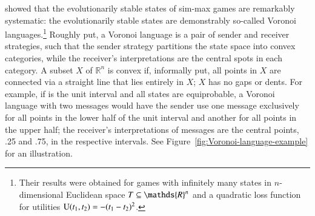 \documentclass[fleqn,reqno,10pt]{article}
\begin{document}
\citet{JagerMetzger2011:Voronoi-Languag} showed that the evolutionarily stable states of
sim-max games are remarkably systematic: the evolutionarily stable states are demonstrably
so-called Voronoi languages.\footnote{Their results were obtained for games with infinitely
  many states in $n$-dimensional Euclidean space $\States \subseteq \mathds{R}^n$ and a
  quadratic loss function for utilities
  $\mathrm{U}(t_{\mathrm{1}}, t_{\mathrm{2}}) = - (t_{\mathrm{1}} - t_{\mathrm{2}})^2$.} Roughly put, a Voronoi
language is a pair of sender and receiver strategies, such that the sender strategy partitions
the state space into convex categories, while the receiver's interpretations are the central
spots in each category. A subset $X$ of $\mathds{R}^n$ is convex if, informally put, all points
in $X$ are connected via a straight line that lies entirely in $X$; $X$ has no gaps or
dents. For example, if \States is the unit interval and all states are equiprobable, a Voronoi
language with two messages would have the sender use one message exclusively for all points in
the lower half of the unit interval and another for all points in the upper half; the
receiver's interpretations of messages are the central points, .25 and .75, in the respective
intervals.  See Figure~\ref{fig:Voronoi-language-example} for an illustration.
\end{document}
